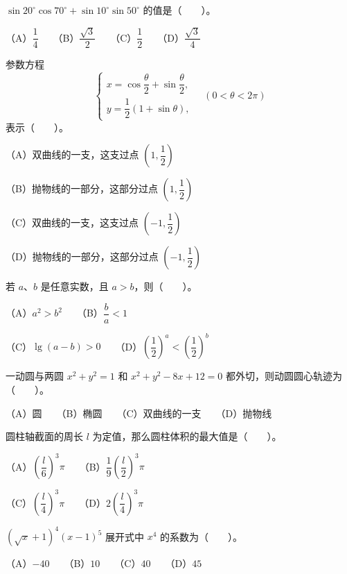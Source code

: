 \begin{question}
$\sin20^\circ\cos70^\circ+\sin10^\circ\sin50^\circ$ 的值是\mbox{（　　）}。

（A）$\dfrac14$　　（B）$\dfrac{\sqrt3}{2}$　　（C）$\dfrac12$　　（D）$\dfrac{\sqrt3}{4}$

\end{question}
\begin{question}
参数方程
\nopagebreak[4]
\[
\begin{cases}
x=\cos\dfrac\theta2+\sin\dfrac\theta2,\\
y=\dfrac12(1+\sin\theta),
\end{cases}\quad(0<\theta<2\pi)
\]
表示\mbox{（　　）}。

（A）双曲线的一支，这支过点 $\left(1,\dfrac12\right)$

（B）抛物线的一部分，这部分过点 $\left(1,\dfrac12\right)$

（C）双曲线的一支，这支过点 $\left(-1,\dfrac12\right)$

（D）抛物线的一部分，这部分过点 $\left(-1,\dfrac12\right)$

\end{question}
\begin{question}
若 $a\text{、}b$ 是任意实数，且 $a>b$，则\mbox{（　　）}。

（A）$a^2>b^2$　　（B）$\dfrac ba<1$

（C）$\lg(a-b)>0$　　（D）$\left(\dfrac12\right)^a<\left(\dfrac12\right)^b$

\end{question}
\begin{question}
一动圆与两圆 $x^2+y^2=1$ 和 $x^2+y^2-8x+12=0$ 都外切，则动圆圆心轨迹为\mbox{（　　）}。

（A）圆　　（B）椭圆　　（C）双曲线的一支　　（D）抛物线

\end{question}
\begin{question}
圆柱轴截面的周长 $l$ 为定值，那么圆柱体积的最大值是\mbox{（　　）}。

（A）$\left(\dfrac l6\right)^3\pi$　　（B）$\dfrac19\left(\dfrac l2\right)^3\pi$

（C）$\left(\dfrac l4\right)^3\pi$　　（D）$2\left(\dfrac l4\right)^3\pi$

\end{question}
\begin{question}
$(\sqrt{x}+1)^4(x-1)^5$ 展开式中 $x^4$ 的系数为\mbox{（　　）}。

（A）$-40$　　（B）$10$　　（C）$40$　　（D）$45$

\end{question}
